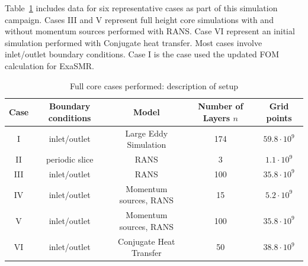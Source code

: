 Table~\ref{tab:full core} includes data for six representative cases as part of this simulation campaign. Cases III and V represent full height core simulations with and without momentum sources performed with RANS. Case VI represent an initial simulation performed with Conjugate heat transfer. Most cases involve inlet/outlet boundary conditions. Case I is the case used the updated FOM calculation for ExaSMR.

\begin{table} \centering \small
 \begin{tabular}{ccccc} \hline \hline
  Case & Boundary conditions & Model & Number of Layers $n$ & Grid points \\ \hline
   I & inlet/outlet & Large Eddy Simulation & 174 & $59.8 \cdot 10^{9}$ \\
   II & periodic slice & RANS & 3 & $1.1 \cdot 10^{9}$ \\
   III & inlet/outlet & RANS & 100 & $35.8 \cdot 10^{9}$ \\
   IV & inlet/outlet & Momentum sources, RANS & 15 & $5.2 \cdot 10^{9}$ \\
   V & inlet/outlet & Momentum sources, RANS & 100 & $35.8 \cdot 10^{9}$ \\
   VI & inlet/outlet & Conjugate Heat Transfer & 50 & $38.8 \cdot 10^{9}$ \\
   \hline \hline
\end{tabular}
 \caption{Full core cases performed: description of setup}
 \label{tab:full core}
\end{table}
